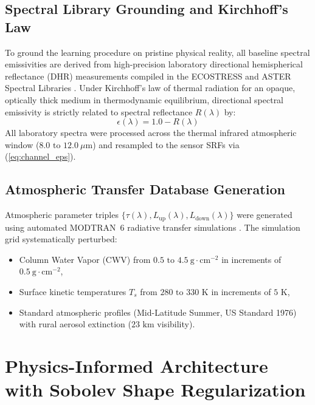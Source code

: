 \documentclass[journal]{IEEEtran}
\begin{document}
\subsection{Spectral Library Grounding and Kirchhoff's Law}
To ground the learning procedure on pristine physical reality, all baseline spectral emissivities are derived from high-precision laboratory directional hemispherical reflectance (DHR) measurements compiled in the ECOSTRESS and ASTER Spectral Libraries \cite{baldridge2009aster, salisbury1992emissivity}. Under Kirchhoff's law of thermal radiation for an opaque, optically thick medium in thermodynamic equilibrium, directional spectral emissivity is strictly related to spectral reflectance $R(\lambda)$ by:
\begin{equation}
\epsilon(\lambda) = 1.0 - R(\lambda)
\label{eq:kirchhoff}
\end{equation}
All laboratory spectra were processed across the thermal infrared atmospheric window ($8.0\text{ to }12.0\ \mu\text{m}$) and resampled to the sensor SRFs via (\ref{eq:channel_eps}).

\subsection{Atmospheric Transfer Database Generation}
Atmospheric parameter triples $\{\tau(\lambda), L_{\text{up}}(\lambda), L_{\text{down}}(\lambda)\}$ were generated using automated MODTRAN~6 radiative transfer simulations \cite{berk2014modtran6}. The simulation grid systematically perturbed:
\begin{itemize}
    \item Column Water Vapor (CWV) from $0.5\text{ to }4.5\ \text{g}\cdot\text{cm}^{-2}$ in increments of $0.5\ \text{g}\cdot\text{cm}^{-2}$,
    \item Surface kinetic temperatures $T_s$ from $280\text{ to }330\text{ K}$ in increments of $5\text{ K}$,
    \item Standard atmospheric profiles (Mid-Latitude Summer, US Standard 1976) with rural aerosol extinction ($23\text{ km}$ visibility).
\end{itemize}

\section{Physics-Informed Architecture with Sobolev Shape Regularization}
\end{document}

